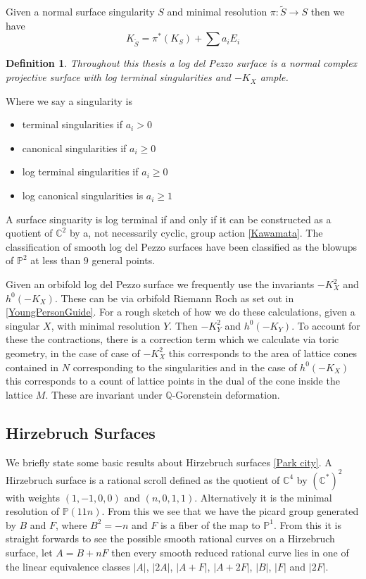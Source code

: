 \documentclass[12pt,a4paper]{book}      %
\newtheorem{dfn}[thm]{Definition}
\newcommand{\mb}[1]{\mathbb{#1}}
\newcommand{\ra}{\rightarrow}
\newcommand{\wt}[1]{\widetilde #1}
\begin{document}
Given a normal surface singularity $S$ and minimal resolution $\pi \colon \wt{S} \ra S$ then we have 
\[
K_{\wt{S}} = \pi^*(K_S) + \sum a_i E_i
\] 
\begin{dfn}
Throughout this thesis a log del Pezzo surface is a normal complex projective surface with log terminal singularities and ${-}K_X$ ample.
\end{dfn}
Where we say a singularity is 
\begin{itemize}
\item terminal singularities if $a_i > 0$
\item canonical singularities if $a_i \geq 0$
\item log terminal singularities if $a_i \geq 0$
\item log canonical singularities is $a_i \geq 1$
\end{itemize}
A surface singuarity is log terminal if and only if it can be constructed as a quotient of $\mb{C}^2$  by a, not necessarily cyclic, group action \ref{Kawamata}. The classification of smooth log del Pezzo surfaces have been classified as the blowups of $\mb{P}^2$ at less than $9$ general points.

Given an orbifold log del Pezzo surface we frequently use the invariants 
${-}K_X^2$ and $h^0({-}K_X)$. These can be via orbifold Riemann Roch as set out in \ref{YoungPersonGuide}. For a rough sketch of how we do these calculations, given a singular $X$, with minimal resolution $Y$. Then ${-}K_Y^2$ and $h^0({-}K_Y)$. To account for these the contractions, there is a correction term which we calculate via toric geometry, in the case of case of ${-}K_X^2$ this corresponds to the area of lattice cones contained in $N$ corresponding to the singularities and in the case of $h^0({-}K_X)$ this corresponds to a count of lattice points in the dual of the cone inside the lattice $M$.  These are invariant under $\mb{Q}$-Gorenstein deformation. 
 
\subsection{Hirzebruch Surfaces} %
We briefly state some basic results about Hirzebruch surfaces \ref{Park city}. A Hirzebruch surface is a rational scroll defined as the quotient of $\mb{C}^4$ by $(\mb{C}^*)^2$ with weights $(1,-1,0,0)$ and $(n, 0, 1,1)$. Alternatively it is the minimal resolution of $\mb{P}(11n)$. From this we see that we have the picard group generated by $B$ and $F$, where $B^2 = -n$ and $F$ is a fiber of the map to $\mb{P}^1$. From this it is straight forwards to see the possible smooth rational curves on a Hirzebruch surface, let $A = B+ nF$ then every smooth reduced rational curve lies in one of the linear equivalence classes $|A|$, $|2A|$, $|A+F|$, $|A+2F|$, $|B|$, $|F|$ and $|2F|$. 
\end{document}
